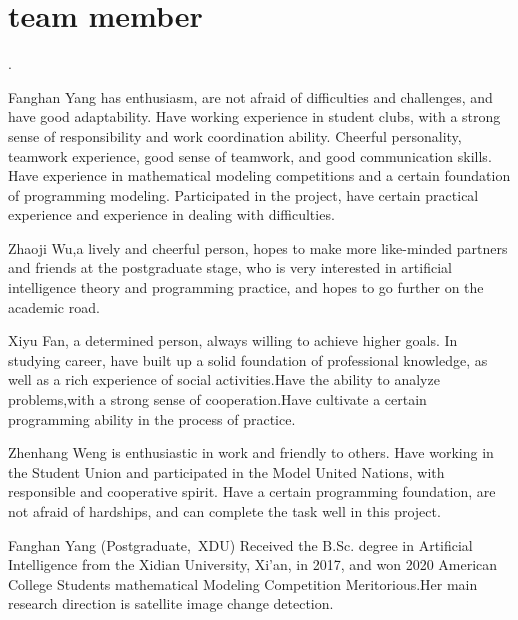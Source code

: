 \documentclass[journal]{IEEEtran}
\begin{document}
\section{team member}
.

Fanghan Yang has enthusiasm, are not afraid of difficulties and challenges, and have good adaptability. Have working experience in student clubs, with a strong sense of responsibility and work coordination ability. Cheerful personality, teamwork experience, good sense of teamwork, and good communication skills. Have experience in mathematical modeling competitions and a certain foundation of programming modeling. Participated in the project, have certain practical experience and experience in dealing with difficulties.

Zhaoji Wu,a lively and cheerful person, hopes to make more like-minded partners and friends at the postgraduate stage, who is very interested in artificial intelligence theory and programming practice, and hopes to go further on the academic road.

 

Xiyu Fan, a determined person, always willing to achieve higher goals.
In studying career, have built up a solid foundation of professional knowledge,
as well as a rich experience of social activities.Have the ability to analyze problems,with a strong sense of cooperation.Have cultivate a certain programming ability in the process of practice. 

Zhenhang Weng is enthusiastic in work and friendly to others. Have working in the Student Union and participated in the Model United Nations, with responsible and cooperative spirit. Have a certain programming foundation, are not afraid of hardships, and can complete the task well in this project.







\begin{IEEEbiography}{Fanghan Yang}
(Postgraduate,~XDU) Received the B.Sc. degree in Artificial Intelligence from the Xidian University, Xi'an, in 2017, and won 2020 American College Students mathematical Modeling Competition Meritorious.Her main research direction is satellite image change detection.

\end{IEEEbiography}
\end{document}
